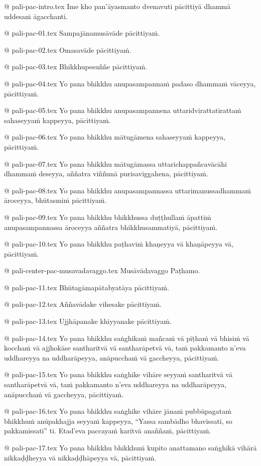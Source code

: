 @ pali-pac-intro.tex
Ime kho pan’āyasmanto dvenavuti pācittiyā dhammā uddesaṁ āgacchanti.

@ pali-pac-01.tex
Sampajānamusāvāde pācittiyaṁ.

@ pali-pac-02.tex
Omasavāde pācittiyaṁ.

@ pali-pac-03.tex
Bhikkhupesuññe pācittiyaṁ.

@ pali-pac-04.tex
Yo pana bhikkhu anupasampannaṁ padaso dhammaṁ vāceyya, pācittiyaṁ.

@ pali-pac-05.tex
Yo pana bhikkhu anupasampannena uttaridvirattatirattaṁ sahaseyyaṁ kappeyya, pācittiyaṁ.

@ pali-pac-06.tex
Yo pana bhikkhu mātugāmena sahaseyyaṁ kappeyya, pācittiyaṁ.

@ pali-pac-07.tex
Yo pana bhikkhu mātugāmassa uttarichappañcavācāhi dhammaṁ deseyya, aññatra viññunā purisaviggahena, pācittiyaṁ.

@ pali-pac-08.tex
Yo pana bhikkhu anupasampannassa uttarimanussadhammaṁ āroceyya, bhūtasmiṁ pācittiyaṁ.

@ pali-pac-09.tex
Yo pana bhikkhu bhikkhussa duṭṭhullaṁ āpattiṁ anupasampannassa āroceyya aññatra bhikkhusammatiyā, pācittiyaṁ.

@ pali-pac-10.tex
Yo pana bhikkhu paṭhaviṁ khaṇeyya vā khaṇāpeyya vā, pācittiyaṁ.

@ pali-center-pac-musavadavaggo.tex
Musāvādavaggo Paṭhamo.

@ pali-pac-11.tex
Bhūtagāmapātabyatāya pācittiyaṁ.

@ pali-pac-12.tex
Aññavādake vihesake pācittiyaṁ.

@ pali-pac-13.tex
Ujjhāpanake khiyyanake pācittiyaṁ.

@ pali-pac-14.tex
Yo pana bhikkhu saṅghikaṁ mañcaṁ vā pīṭhaṁ vā bhisiṁ vā kocchaṁ vā ajjhokāse santharitvā vā santharāpetvā vā, taṁ pakkamanto n’eva uddhareyya na uddharāpeyya, anāpucchaṁ vā gaccheyya, pācittiyaṁ.

@ pali-pac-15.tex
Yo pana bhikkhu saṅghike vihāre seyyaṁ santharitvā vā santharāpetvā vā, taṁ pakkamanto n’eva uddhareyya na uddharāpeyya, anāpucchaṁ vā gaccheyya, pācittiyaṁ.

@ pali-pac-16.tex
Yo pana bhikkhu saṅghike vihāre jānaṁ pubbūpagataṁ bhikkhuṁ anūpakhajja seyyaṁ kappeyya, “Yassa sambādho bhavissati, so pakkamissatī” ti. Etad’eva paccayaṁ karitvā anaññaṁ, pācittiyaṁ.

@ pali-pac-17.tex
Yo pana bhikkhu bhikkhuṁ kupito anattamano saṅghikā vihārā nikkaḍḍheyya vā nikkaḍḍhāpeyya vā, pācittiyaṁ.

